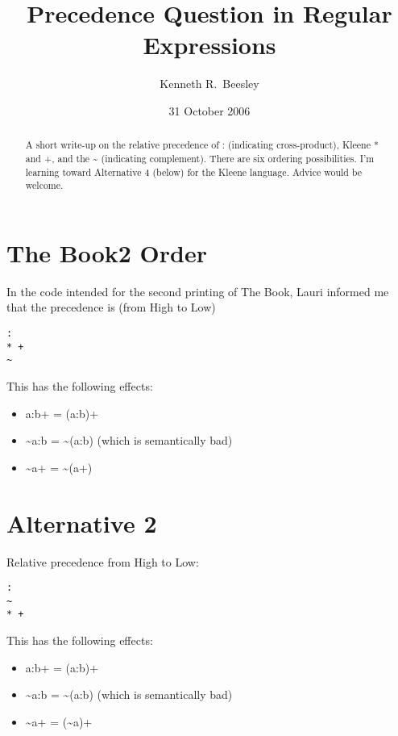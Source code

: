 \documentclass[letterpaper,12pt]{article}
\title{Precedence Question in Regular Expressions}
\author{Kenneth R.~Beesley}
\date{31 October 2006}
\begin{document}
\maketitle

\begin{abstract}
A short write-up on the relative precedence of : (indicating
cross-product), Kleene * and +, and the \~{} (indicating
complement).  There are six ordering possibilities.  I'm learning
toward Alternative 4 (below) for the Kleene language.  Advice would be welcome.

\end{abstract}

\section{The Book2 Order}

In the code intended for the second printing of The Book, Lauri
informed me that the precedence is (from High to Low)

\begin{Verbatim}[fontsize=\small]
:
* +
~
\end{Verbatim}

\noindent
This has the following effects:

\begin{itemize}
\item
a:b+ = (a:b)+
\item
\~{}a:b = \~{}(a:b)   (which is semantically bad)
\item
\~{}a+ = \~{}(a+)
\end{itemize}


\section{Alternative 2}

Relative precedence from High to Low:

\begin{Verbatim}[fontsize=\small]
:
~
* +
\end{Verbatim}

\noindent
This has the following effects:

\begin{itemize}
\item
a:b+ = (a:b)+
\item
\~{}a:b = \~{}(a:b)   (which is semantically bad)
\item
\~{}a+ = (\~{}a)+
\end{itemize}
\end{document}
